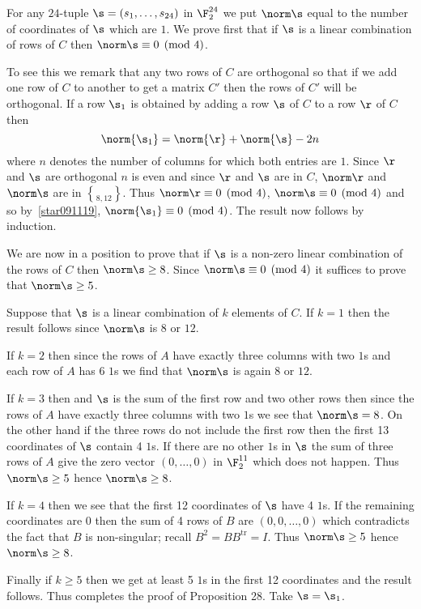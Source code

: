 For any $24$-tuple $\s=(s_1,\dotsc,s_{24})$ in $\F_2^{24}$ we put $\norm\s$ equal to the number of coordinates of $\s$ which are $1$.  We prove first that if $\s$ is a linear combination of rows of $C$ then $\norm\s\equiv0\pmod4$.

To see this we remark that any two rows of $C$ are orthogonal so that if we add one row of $C$ to another to get a matrix $C'$ then the rows of $C'$ will be orthogonal.  If a row $\s_1$ is obtained by adding a row $\s$ of $C$ to a row $\r$ of $C$ then
\begin{equation} \norm{\s_1} = \norm{\r} + \norm{\s} - 2n \label{star091119} \end{equation}
where $n$ denotes the number of columns for which both entries are $1$.  Since $\r$ and $\s$ are orthogonal $n$ is even and since $\r$ and $\s$ are in $C$, $\norm\r$ and $\norm\s$ are in $\brace{8,12}$.  Thus $\norm\r\equiv0\pmod4$, $\norm\s\equiv0\pmod4$ and so by~\eqref{star091119}, $\norm{\s_1}\equiv0\pmod4$.  The result now follows by induction.

We are now in a position to prove that if $\s$ is a non-zero linear combination of the rows of $C$ then $\norm\s\geq8$.  Since $\norm\s\equiv0\pmod4$ it suffices to prove that $\norm\s\geq5$.

Suppose that $\s$ is a linear combination of $k$ elements of $C$.  If $k=1$ then the result follows since $\norm\s$ is $8$ or $12$.

If $k=2$ then since the rows of $A$ have exactly three columns with two $1$s and each row of $A$ has 6 $1$s we find that $\norm\s$ is again $8$ or $12$.

If $k=3$ then and $\s$ is the sum of the first row and two other rows then since the rows of $A$ have exactly three columns with two $1$s we see that $\norm\s=8$.  On the other hand if the three rows do not include the first row then the first 13 coordinates of $\s$ contain 4 $1$s.  If there are no other $1$s in $\s$ the sum of three rows of $A$ give the zero vector $(0,\dotsc,0)$ in $\F_2^{11}$ which does not happen.  Thus $\norm\s\geq5$ hence $\norm\s\geq8$.

If $k=4$ then we see that the first 12 coordinates of $\s$ have 4 $1$s.  If the remaining coordinates are $0$ then the sum of 4 rows of $B$ are $(0,0,\dotsc,0)$ which contradicts the fact that $B$ is non-singular; recall $B^2=BB^\text{tr}=I$.  Thus $\norm\s\geq5$ hence $\norm\s\geq8$.

Finally if $k\geq5$ then we get at least 5 $1$s in the first 12 coordinates and the result follows.  Thus completes the proof of Proposition 28.  Take $\s=\s_1$.

